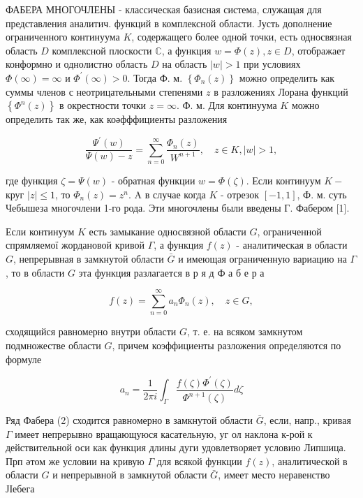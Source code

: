 \documentclass[10pt]{article}
\begin{document}
ФАБЕРА МНОГОЧЛЕНЫ - классическая базисная система, служащая для представления аналитич. функций в комплексной области. Јусть дополнение ограниченного континуума $K$, содержащего более одной точки, есть односвязная область $D$ комплексной плоскости $\mathbb{C}$, а функция $w=\Phi(z), z \in D$, отображает конформно и однолистно область $D$ на область $|w|>1$ при условиях $\Phi(\infty)=\infty$ и $\Phi^{\prime}(\infty)>0$. Тогда Ф. м. $\left\{\Phi_{n}(z)\right\}$ можно определить как суммы членов с неотрицательными степенями $z$ в разложениях Лорана функций $\left\{\Phi^{n}(z)\right\}$ в окрестности точки $z=\infty$. Ф. м. Для континуума $K$ можно определить так же, как коәфффициенты разложения



\[

\frac{\Psi^{\prime}(w)}{\Psi(w)-z}=\sum_{n=0}^{\infty} \frac{\Phi_{n}(z)}{W^{n+1}}, \quad z \in K,|w|>1,

\]



где функция $\zeta=\Psi(w)$ - обратная функции $w=\Phi(\zeta)$. Если континуум $K-$ круг $|z| \leqslant 1$, то $\Phi_{n}(z)=z^{n}$. A в случае когда $K$ - отрезок $[-1,1]$, Ф. м. суть Чебышеза многочлени 1-го рода. Эти многочлены были введены Г. Фабером [1].



Если континуум $K$ есть замыкание односвязной области $G$, ограниченной спрямляемої жордановой кривой $\Gamma$, а функция $f(z)$ - аналитическая в области $G$, непрерывная в замкнутой области $\bar{G}$ и имеющая ограниченную вариацию на $\Gamma$, то в области $G$ эта функция разлагается в р я д Ф а б е р а



\[

f(z)=\sum_{n=0}^{\infty} a_{n} \Phi_{n}(z), \quad z \in G,

\]



сходящийся равномерно внутри области $G$, т. е. на всяком замкнутом подмножестве области $G$, причем коэффициенты разложения определяются по формуле



\[

a_{n}=\frac{1}{2 \pi i} \int_{\Gamma} \frac{f(\zeta) \Phi^{\prime}(\zeta)}{\Phi^{n+1}(\zeta)} d \zeta

\]



Ряд Фабера (2) сходится равномерно в замкнутой области $\bar{G}$, если, напр., кривая $\Gamma$ имеет непрерывно вращающуюся касательную, уг ол наклона к-рой к действительной оси как функция длины дуги удовлетворяет условию Липшица. Прп әтом же условии на кривую $\Gamma$ для всякой функции $f(z)$, аналитической в области $G$ и непрерывной в замкнутой области $\bar{G}$, имеет место неравенство ЈІебега
\end{document}
